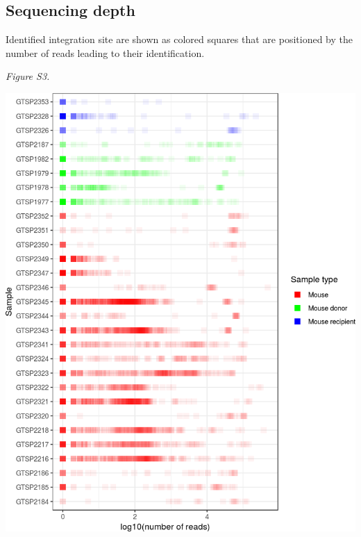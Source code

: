 \documentclass[12pt,]{article}
\begin{document}
\newpage

\subsection{Sequencing depth}\label{sequencing-depth}

Identified integration site are shown as colored squares that are
positioned by the number of reads leading to their identification.

\emph{Figure S3.}

\includegraphics{project.group2_files/figure-latex/FigS3cont-1.png}
\end{document}
